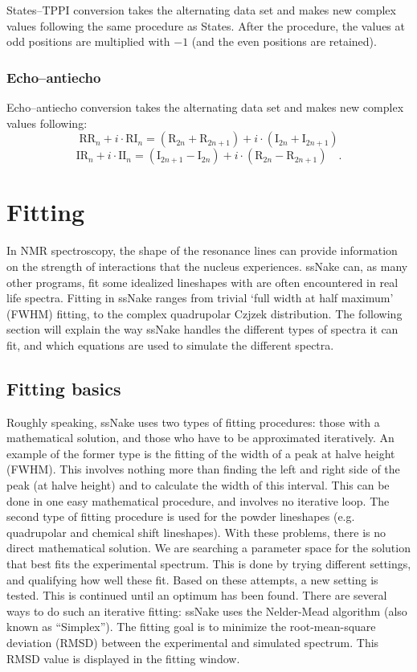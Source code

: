 \documentclass[11pt,a4paper]{article}
\begin{document}
States--TPPI conversion takes the alternating data set and makes new complex values following the
same procedure as States. After the procedure, the values at odd positions are multiplied with $-1$
(and the even positions are retained).

\subsubsection{Echo--antiecho}
Echo--antiecho conversion takes the alternating data set and makes new complex values following:
\begin{equation*}
  \text{RR}_n + i \cdot \text{RI}_n = (\text{R}_{2n} +\text{R}_{2n+1})  + i \cdot (\text{I}_{2n} +
  \text{I}_{2n+1})
\end{equation*}
\begin{equation*}
  \text{IR}_n + i \cdot \text{II}_n = (\text{I}_{2n+1} - \text{I}_{2n}) + i \cdot (\text{R}_{2n} - \text{R}_{2n+1}  ) \quad .
\end{equation*}

\section{Fitting}
In NMR spectroscopy, the shape of the resonance lines can provide information on the strength of
interactions that the nucleus experiences.  ssNake can, as many other programs, fit some idealized
lineshapes with are often encountered in real life spectra.  Fitting in ssNake ranges from trivial
`full width at half maximum' (FWHM) fitting, to the complex quadrupolar Czjzek distribution.  The
following section will explain the way ssNake handles the different types of spectra it can fit, and
which equations are used to simulate the different spectra.

\subsection{Fitting basics}
Roughly speaking, ssNake uses two types of fitting procedures: those with a mathematical solution, and those who have to be approximated iteratively.
An example of the former type is the fitting of the width of a peak at halve height (FWHM).
This involves nothing more than finding the left and right side of the peak (at halve height) and to calculate the width of this interval.
This can be done in one easy mathematical procedure, and involves no iterative loop.
The second type of fitting procedure is used for the powder lineshapes (e.g. quadrupolar and chemical shift lineshapes).
With these problems, there is no direct mathematical solution.
We are searching a parameter space for the solution that best fits the experimental spectrum.
This is done by trying different settings, and qualifying how well these fit.
Based on these attempts, a new setting is tested. This is continued until an optimum has been found.
There are several ways to do such an iterative fitting: ssNake uses the Nelder-Mead algorithm \cite{nelder1965simplex} (also known as ``Simplex''). The fitting goal is to minimize the root-mean-square deviation (RMSD) between the experimental and simulated spectrum. This RMSD value is displayed in the fitting window.
\end{document}

